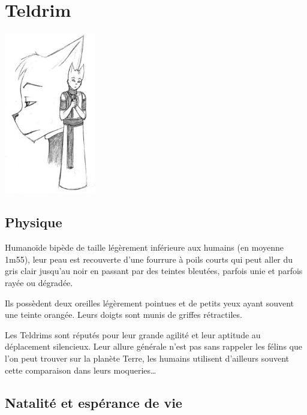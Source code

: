 
\chapter{Teldrim}

\begin{multicols}{2}

\begin{center}
	\includegraphics[width=113pt]{Img/teldrim}
\end{center}

\section{Physique}

Humanoïde bipède de taille légèrement inférieure aux humains (en moyenne 1m55), leur peau est recouverte d'une fourrure à poils courts qui peut aller du gris clair jusqu'au noir en passant par des teintes bleutées, parfois unie et parfois rayée ou dégradée.

Ils possèdent deux oreilles légèrement pointues et de petits yeux ayant souvent une teinte orangée. Leurs doigts sont munis de griffes rétractiles.

Les Teldrims sont réputés pour leur grande agilité et leur aptitude au déplacement silencieux. Leur allure générale n'est pas sans rappeler les félins que l'on peut trouver sur la planète Terre, les humains utilisent d'ailleurs souvent cette comparaison dans leurs moqueries…

\section{Natalité et espérance de vie}


\end{multicols}
